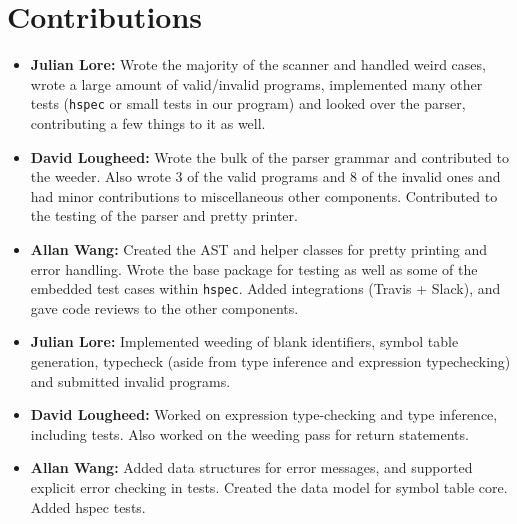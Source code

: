 \documentclass[11pt]{article}
\begin{document}
\section{Contributions}
\begin{itemize}
	\item \textbf{Julian Lore:} Wrote the majority of the scanner and handled weird
	      cases, wrote a large amount of valid/invalid programs, implemented
	      many other tests (\texttt{hspec} or small tests in our program) and looked
	      over the parser, contributing a few things to it as well.
	\item \textbf{David Lougheed:} Wrote the bulk of the parser grammar and contributed to
	      the weeder. Also wrote 3 of the valid programs and 8 of the
	      invalid ones and had minor contributions to miscellaneous other components.
	      Contributed to the testing of the parser and pretty printer.
	\item \textbf{Allan Wang:} Created the AST and helper classes for pretty printing
	      and error handling.  Wrote the base package for testing as well as
	      some of the embedded test cases within \texttt{hspec}.  Added integrations
	      (Travis + Slack), and gave code reviews to the other components.
            \end{itemize}
            \begin{itemize}
\item \textbf{Julian Lore:} Implemented weeding of blank identifiers, symbol
table generation, typecheck (aside from type inference and
expression typechecking) and submitted invalid programs.
\item \textbf{David Lougheed:} Worked on expression type-checking and type inference,
including tests. Also worked on the weeding pass for return
statements.
\item \textbf{Allan Wang:} Added data structures for error messages, and supported
explicit error checking in tests. Created the data model for
symbol table core. Added hspec tests.
\end{itemize}
\end{document}
